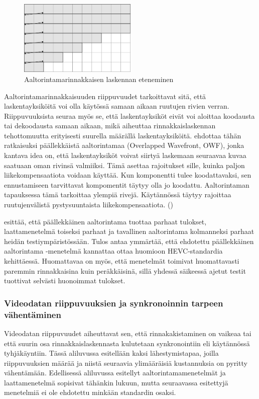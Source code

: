\begin{figure}[ht]
	\centering
	\includegraphics[width=0.5\textwidth]{WPP.jpg}
	\caption{Aaltorintamarinnakkaisen laskennan eteneminen}
	\label{fig:wpp}
\end{figure}

Aaltorintamarinnakkaisuuden riippuvuudet tarkoittavat sitä, että
laskentayksiköitä voi olla käytössä samaan aikaan ruutujen rivien verran.
Riippuvuuksista seuraa myös se, että laskentayksiköt eivät voi aloittaa
koodausta tai dekoodausta samaan aikaan, mikä aiheuttaa rinnakkaislaskennan
tehottomuutta erityisesti suurella määrällä laskentayksiköitä.
\citealt{chi} ehdottaa tähän ratkaisuksi päällekkäistä
aaltorintamaa (Overlapped Wavefront, OWF), jonka kantava idea on, että
laskentayksiköt voivat siirtyä laskemaan seuraavaa kuvaa saatuaan oman rivinsä
valmiiksi. Tämä asettaa rajoitukset sille, kuinka paljon liikekompensaatiota
voidaan käyttää. Kun komponentti tulee koodattavaksi, sen ennustamiseen
tarvittavat kompomentit täytyy olla jo koodattu. Aaltorintaman tapauksessa
tämä tarkoittaa ylempiä rivejä. Käytännössä täytyy rajoittaa ruutujenvälistä
pystysuuntaista liikekompensaatiota. (\citealt{chi})

\citealt{chi} esittää, että päällekkäinen aaltorintama tuottaa parhaat tulokset,
laattamenetelmä toiseksi parhaat ja tavallinen aaltorintama kolmanneksi parhaat
heidän testiympäristössään. Tulos antaa ymmärtää, että ehdotettu päällekkäinen
aaltorintama -menetelmä kannattaa ottaa huomioon HEVC-standardia kehittäessä.
Huomattavaa on myös, että menetelmät toimivat huomattavasti paremmin
rinnakkaisina kuin peräkkäisinä, sillä yhdessä säikeessä ajetut testit
tuottivat selvästi huonoimmat tulokset.

\subsubsection{Videodatan riippuvuuksien ja synkronoinnin tarpeen vähentäminen}

Videodatan riippuvuudet aiheuttavat sen, että rinnakakistaminen on vaikeaa tai
että suurin osa rinnakkaislaskennasta kulutetaan synkronointiin eli käytännössä
tyhjäkäyntiin. Tässä aliluvussa esitellään kaksi lähestymistapaa, joilla
riippuvuuksien määrää ja niistä seuraavia ylimääräisiä kustannuksia on pyritty
vähentämään. Edellisessä aliluvussa esitellyt aaltorintamamenetelmät ja
laattamenetelmä sopisivat tähänkin lukuun, mutta seuraavassa esitettyjä
menetelmiä ei ole ehdotettu minkään standardin osaksi.

